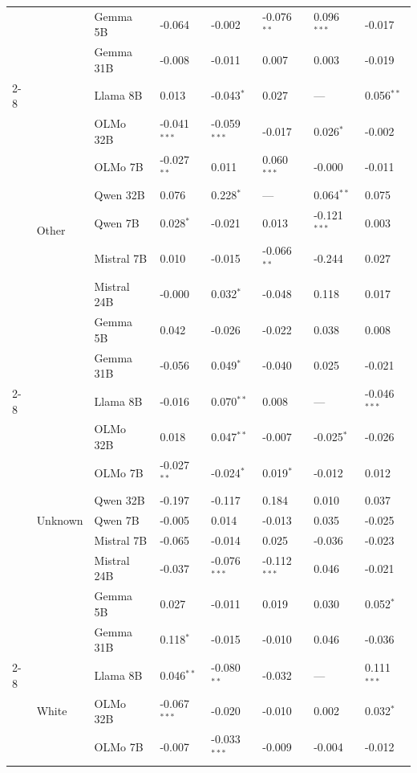 \begin{longtable}[t]{llllllll}
 &  & Gemma 5B & -0.064 & -0.002 & -0.076$^{**}$ & 0.096$^{***}$ & -0.017 \\
 &  & Gemma 31B & -0.008 & -0.011 & 0.007 & 0.003 & -0.019 \\
\cline{2-8}
 & \multirow[t]{9}{*}{Other} & Llama 8B & 0.013 & -0.043$^{*}$ & 0.027 & --- & 0.056$^{**}$ \\
 &  & OLMo 32B & -0.041$^{***}$ & -0.059$^{***}$ & -0.017 & 0.026$^{*}$ & -0.002 \\
 &  & OLMo 7B & -0.027$^{**}$ & 0.011 & 0.060$^{***}$ & -0.000 & -0.011 \\
 &  & Qwen 32B & 0.076 & 0.228$^{*}$ & --- & 0.064$^{**}$ & 0.075 \\
 &  & Qwen 7B & 0.028$^{*}$ & -0.021 & 0.013 & -0.121$^{***}$ & 0.003 \\
 &  & Mistral 7B & 0.010 & -0.015 & -0.066$^{**}$ & -0.244 & 0.027 \\
 &  & Mistral 24B & -0.000 & 0.032$^{*}$ & -0.048 & 0.118 & 0.017 \\
 &  & Gemma 5B & 0.042 & -0.026 & -0.022 & 0.038 & 0.008 \\
 &  & Gemma 31B & -0.056 & 0.049$^{*}$ & -0.040 & 0.025 & -0.021 \\
\cline{2-8}
 & \multirow[t]{9}{*}{Unknown} & Llama 8B & -0.016 & 0.070$^{**}$ & 0.008 & --- & -0.046$^{***}$ \\
 &  & OLMo 32B & 0.018 & 0.047$^{**}$ & -0.007 & -0.025$^{*}$ & -0.026 \\
 &  & OLMo 7B & -0.027$^{**}$ & -0.024$^{*}$ & 0.019$^{*}$ & -0.012 & 0.012 \\
 &  & Qwen 32B & -0.197 & -0.117 & 0.184 & 0.010 & 0.037 \\
 &  & Qwen 7B & -0.005 & 0.014 & -0.013 & 0.035 & -0.025 \\
 &  & Mistral 7B & -0.065 & -0.014 & 0.025 & -0.036 & -0.023 \\
 &  & Mistral 24B & -0.037 & -0.076$^{***}$ & -0.112$^{***}$ & 0.046 & -0.021 \\
 &  & Gemma 5B & 0.027 & -0.011 & 0.019 & 0.030 & 0.052$^{*}$ \\
 &  & Gemma 31B & 0.118$^{*}$ & -0.015 & -0.010 & 0.046 & -0.036 \\
\cline{2-8}
 & \multirow[t]{9}{*}{White} & Llama 8B & 0.046$^{**}$ & -0.080$^{**}$ & -0.032 & --- & 0.111$^{***}$ \\
 &  & OLMo 32B & -0.067$^{***}$ & -0.020 & -0.010 & 0.002 & 0.032$^{*}$ \\
 &  & OLMo 7B & -0.007 & -0.033$^{***}$ & -0.009 & -0.004 & -0.012 \\

\end{longtable}
